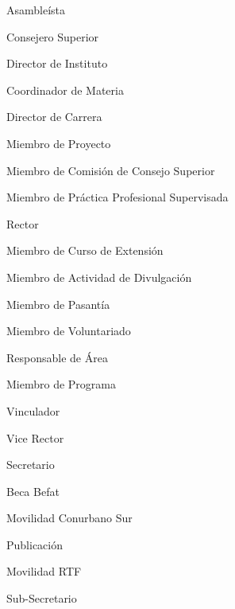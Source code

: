 \item Asambleísta
\item Consejero Superior
\item Director de Instituto
\item Coordinador de Materia
\item Director de Carrera
\item Miembro de Proyecto
\item Miembro de Comisión de Consejo Superior
\item Miembro de Práctica Profesional Supervisada
\item Rector
\item Miembro de Curso de Extensión
\item Miembro de Actividad de Divulgación
\item Miembro de Pasantía
\item Miembro de Voluntariado
\item Responsable de Área
\item Miembro de Programa
\item Vinculador
\item Vice Rector
\item Secretario
\item Beca Befat
\item Movilidad Conurbano Sur
\item Publicación
\item Movilidad RTF
\item Sub-Secretario
